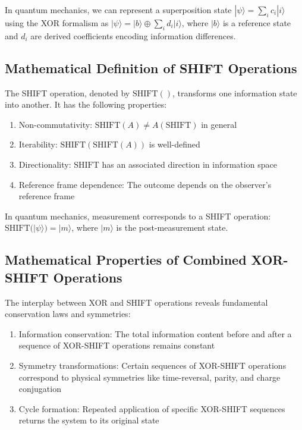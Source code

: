 \documentclass[aps,prl,preprint,superscriptaddress,showpacs]{revtex4-2}
\newcommand{\xor}{\oplus}
\newcommand{\shift}{\text{SHIFT}}
\begin{document}
In quantum mechanics, we can represent a superposition state $|\psi\rangle = \sum_i c_i |i\rangle$ using the XOR formalism as $|\psi\rangle = |b\rangle \xor \sum_i d_i |i\rangle$, where $|b\rangle$ is a reference state and $d_i$ are derived coefficients encoding information differences.

\subsection{Mathematical Definition of SHIFT Operations}

The SHIFT operation, denoted by $\shift()$, transforms one information state into another. It has the following properties:

\begin{enumerate}
\item Non-commutativity: $\shift(A) \neq A(\shift)$ in general
\item Iterability: $\shift(\shift(A))$ is well-defined
\item Directionality: $\shift$ has an associated direction in information space
\item Reference frame dependence: The outcome depends on the observer's reference frame
\end{enumerate}

In quantum mechanics, measurement corresponds to a SHIFT operation: $\shift(|\psi\rangle) = |m\rangle$, where $|m\rangle$ is the post-measurement state.

\subsection{Mathematical Properties of Combined XOR-SHIFT Operations}

The interplay between XOR and SHIFT operations reveals fundamental conservation laws and symmetries:

\begin{enumerate}
\item Information conservation: The total information content before and after a sequence of XOR-SHIFT operations remains constant
\item Symmetry transformations: Certain sequences of XOR-SHIFT operations correspond to physical symmetries like time-reversal, parity, and charge conjugation
\item Cycle formation: Repeated application of specific XOR-SHIFT sequences returns the system to its original state
\end{enumerate}
\end{document}
